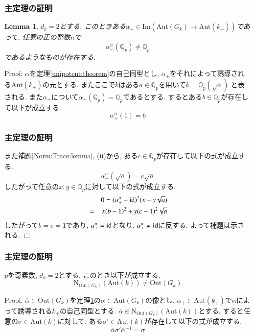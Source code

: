 \documentclass[dvipdfmx,19.8pt]{beamer}
\newcommand{\Blue}{\color{blue}}
\def\qed{\hfill $\Box$}
\theoremstyle{theorem}
\newtheorem{lem}[theorem]{Lemma}
\theoremstyle{definition}
\def\bQ{{\mathbb Q}}
\def\Im{{\mathrm{Im}}}
\def\Aut{{\mathrm{Aut}}}
\def\Out{{\mathrm{Out}}}
\begin{document}
\begin{frame}[fragile]
	\frametitle{主定理の証明}

\begin{lem}\label{not:Q_p:preserving}
$d_k = 2$とする. このときある$\alpha_+ \in \Im (\Aut(G_k) \rightarrow \Aut(k_+))$であって, 任意の正の整数$n$で
\[
\alpha_+^n(\bQ_p) \neq \bQ_p
\]
であるようなものが存在する. 
\end{lem}

{\Blue Proof:}
$\alpha$を定理\ref{unipotent:theorem}の自己同型とし, $\alpha_+$をそれによって誘導される$\Aut(k_+)$の元とする. またここで$k$はある$a \in \bQ_p$を用いて$k=\bQ_p(\sqrt{a})$ と表される. また$\alpha_+$について$\alpha_+(\bQ_p)=\bQ_p$であるとする. するとある$b \in \bQ_p$が存在して以下が成立する. 
\[
\alpha_+^n(1) = b
\]


\end{frame}







\begin{frame}[fragile]
	\frametitle{主定理の証明}

また補題\ref{Norm:Trace:lemma}, (ii)から, ある$c \in \bQ_p$が存在して以下の式が成立する. 
\[
\alpha_+^n(\sqrt{a}) = c \sqrt{a}
\]
したがって任意の$x, y \in \bQ_p$に対して以下の式が成立する. 
\begin{eqnarray}
&&0 = (\alpha_+^n - {\rm id})^2 (x+y\sqrt{a}) \nonumber \\
&=&x(b-1)^2 + y(c-1)^2 \sqrt{a} \nonumber
\end{eqnarray}
したがって$b=c=1$であり, $\alpha_+^n = {\rm id}$となり, $\alpha_+^n \neq {\rm id}$に反する. 
よって補題は示される. 
\qed
\end{frame}




\begin{frame}[fragile]
	\frametitle{主定理の証明}

\begin{theorem}\label{main:theorem:d_k=2}
$p$を奇素数, $d_k=2$とする. このとき以下が成立する. 
\[
\mathrm{N}_{\Out(G_k)}(\Aut(k)) \neq \Out(G_k)
\]
\end{theorem}

{\Blue Proof:}
$\overline{\alpha} \in \Out(G_k)$を定理\ref{not:Q_p:preserving}の$\alpha \in \Aut(G_k)$の像とし, $\alpha_+ \in \Aut(k_+)$で$\alpha$によって誘導される$k_+$の自己同型とする. $\overline{\alpha} \in \mathrm{N}_{\Out(G_k)}(\Aut(k))$とする. すると任意の$\sigma \in \Aut(k)$に対して, ある$\sigma' \in \Aut(k)$が存在して以下の式が成立する. 
\[
\overline{\alpha} \sigma' \overline{\alpha}^{-1} = \sigma
\]



\end{frame}
\end{document}
